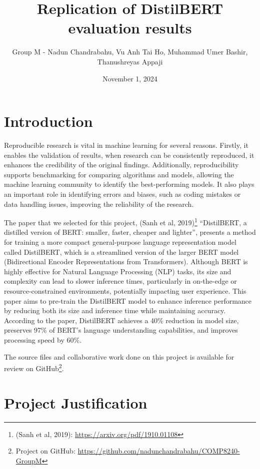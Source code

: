 \documentclass[
  11pt,
]{article}
\title{Replication of DistilBERT evaluation results}
\author{Group M - Nadun Chandrabahu, Vu Anh Tai Ho, Muhammad Umer
Bashir, Thanushreyas Appaji}
\date{November 1, 2024}
\begin{document}
\maketitle

\hypertarget{introduction}{%
\section{Introduction}\label{introduction}}

Reproducible research is vital in machine learning for several reasons.
Firstly, it enables the validation of results, when research can be
consistently reproduced, it enhances the credibility of the original
findings. Additionally, reproducibility supports benchmarking for
comparing algorithms and models, allowing the machine learning community
to identify the best-performing models. It also plays an important role
in identifying errors and biases, such as coding mistakes or data
handling issues, improving the reliability of the research.

The paper that we selected for this project, (Sanh et al,
2019)\footnote{(Sanh et al, 2019):
  \url{https://arxiv.org/pdf/1910.01108}} ``DistilBERT, a distilled
version of BERT: smaller, faster, cheaper and lighter'', presents a
method for training a more compact general-purpose language
representation model called DistilBERT, which is a streamlined version
of the larger BERT model (Bidirectional Encoder Representations from
Transformers). Although BERT is highly effective for Natural Language
Processing (NLP) tasks, its size and complexity can lead to slower
inference times, particularly in on-the-edge or resource-constrained
environments, potentially impacting user experience. This paper aims to
pre-train the DistilBERT model to enhance inference performance by
reducing both its size and inference time while maintaining accuracy.
According to the paper, DistilBERT achieves a 40\% reduction in model
size, preserves 97\% of BERT's language understanding capabilities, and
improves processing speed by 60\%.

The source files and collaborative work done on this project is
available for review on GitHub\footnote{Project on GitHub:
  \url{https://github.com/nadunchandrabahu/COMP8240-GroupM}}.

\hypertarget{project-justification}{%
\section{Project Justification}\label{project-justification}}
\end{document}
